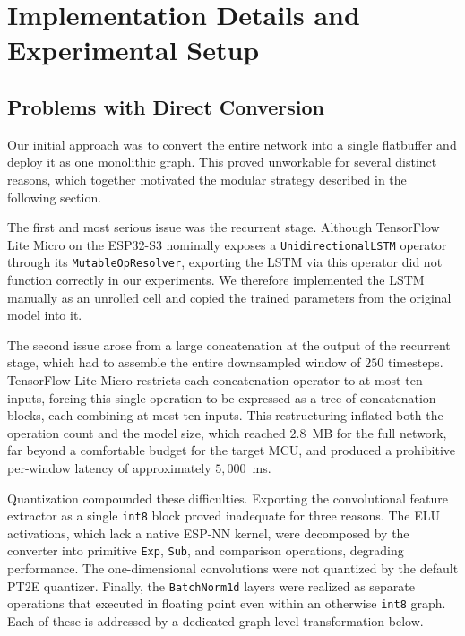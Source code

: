\documentclass[12pt,DIV16,BCOR12mm,a4paper,footinclude=false,headinclude,parskip=half-,twoside,openright,cleardoublepage=empty,toc=index,bibliography=totoc,listof=totoc]{scrreprt}
\numberwithin{equation}{chapter}
\begin{document}
  \section{Implementation Details and Experimental Setup}
  \subsection{Problems with Direct Conversion}

  Our initial approach was to convert the entire network into a single flatbuffer and
  deploy it as one monolithic graph. This proved unworkable for several distinct reasons,
  which together motivated the modular strategy described in the following section.

  The first and most serious issue was the recurrent stage. Although TensorFlow Lite
  Micro on the ESP32-S3 nominally exposes a \texttt{UnidirectionalLSTM} operator through
  its \texttt{MutableOpResolver}, exporting the LSTM via this operator did not function
  correctly in our experiments. We therefore implemented the LSTM manually as an unrolled
  cell and copied the trained parameters from the original model into it.

  The second issue arose from a large concatenation at the output of the recurrent stage,
  which had to assemble the entire downsampled window of $250$ timesteps. TensorFlow Lite
  Micro restricts each concatenation operator to at most ten inputs, forcing this single
  operation to be expressed as a tree of concatenation blocks, each combining at most ten
  inputs. This restructuring inflated both the operation count and the model size, which
  reached $2.8$~MB for the full network, far beyond a comfortable budget for the target
  MCU, and produced a prohibitive per-window latency of approximately $5{,}000$~ms.

  Quantization compounded these difficulties. Exporting the convolutional feature
  extractor as a single \texttt{int8} block proved inadequate for three reasons. The ELU
  activations, which lack a native ESP-NN kernel, were decomposed by the converter into
  primitive \texttt{Exp}, \texttt{Sub}, and comparison operations, degrading performance.
  The one-dimensional convolutions were not quantized by the default PT2E quantizer.
  Finally, the \texttt{BatchNorm1d} layers were realized as separate operations that
  executed in floating point even within an otherwise \texttt{int8} graph. Each of these
  is addressed by a dedicated graph-level transformation below.
\end{document}
